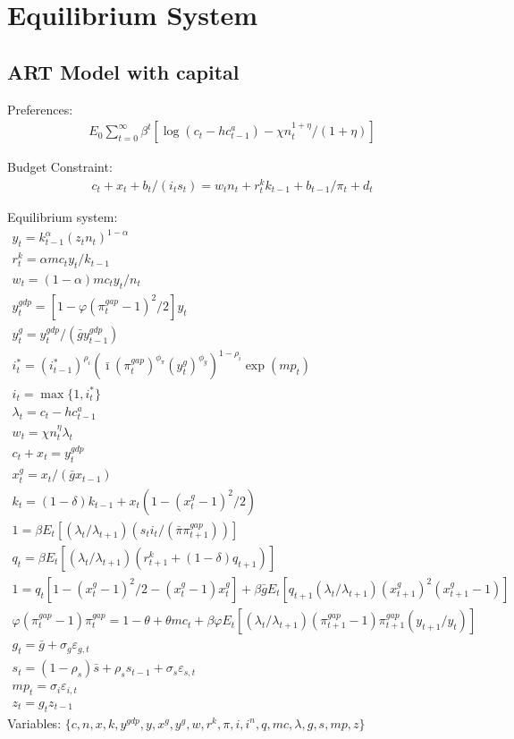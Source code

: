 \documentclass[12pt, final]{article}
\begin{document}
\section{Equilibrium System}

\subsection{ART Model with capital}
\noindent Preferences:
\begin{gather*}
  E_0\textstyle\sum_{t=0}^\infty\beta^t [\log(c_t-hc^a_{t-1})-\chi n_t^{1+\eta}/(1+\eta)]
\end{gather*}

\noindent Budget Constraint:
\begin{gather*}
  c_t+x_t+b_t/(i_ts_t)=w_tn_t+r_t^kk_{t-1}+b_{t-1}/\pi_t+d_t%
\end{gather*}

\setcounter{equation}{0}
\noindent Equilibrium system:
\small\begin{gather}
y_t = k_{t-1}^\alpha(z_t n_t)^{1-\alpha}\\ %
r_t^k = \alpha mc_ty_t/k_{t-1}\\
w_t = (1-\alpha)mc_ty_t/n_t\\
y_t^{gdp} = [1 - \varphi(\pi_t^{gap}-1)^2/2]y_t \\
y^g_t = y^{gdp}_t/(\bar{g}y^{gdp}_{t-1})\\
i_t^*=(i^*_{t-1})^{\rho_i}(\bar{\imath}(\pi^{gap}_t)^{\phi_\pi}(y^{g}_{t})^{\phi_y})^{1-\rho_i}\exp(mp_t)\\
i_t=\max\{1,i_t^*\}\\
\lambda_t = c_t - hc^a_{t-1} \\
w_t = \chi n_t^\eta \lambda_t\\
c_t + x_t = y_t^{gdp}\\
x_t^g = x_t/(\bar{g}x_{t-1})\\
k_t = (1-\delta)k_{t-1}+x_t(1-(x_t^g-1)^2/2) \\%
1 =  \beta E_t[(\lambda_t/\lambda_{t+1})(s_ti_t/(\bar{\pi}\pi_{t+1}^{gap}))]\\
q_t = \beta E_t[(\lambda_t/\lambda_{t+1})(r^k_{t+1}+(1-\delta)q_{t+1})]\\
1 = q_t[1-(x^g_t-1)^2/2 - (x_t^g-1)x_t^g] + \beta\bar{g}E_t[q_{t+1}(\lambda_t/\lambda_{t+1})(x^g_{t+1})^2(x^g_{t+1}-1)]\\
\varphi(\pi_t^{gap}-1)\pi_t^{gap} = 1-\theta + \theta mc_t + \beta\varphi E_t[(\lambda_t/\lambda_{t+1})(\pi_{t+1}^{gap}-1)\pi_{t+1}^{gap}(y_{t+1}/y_t)]\\
g_t = \bar{g} + \sigma_g\varepsilon_{g,t}\\
s_t=(1-\rho_s)\bar{s}+\rho_ss_{t-1} + \sigma_s\varepsilon_{s,t}\\
mp_t = \sigma_i\varepsilon_{i,t}\\
  z_t=g_tz_{t-1}
\end{gather}\normalsize
Variables: $\{c,n,x,k,y^{gdp},y,x^g,y^g,w,r^k,\pi,i,i^n,q,mc,\lambda,g,s,mp,z\}$\\
\end{document}
